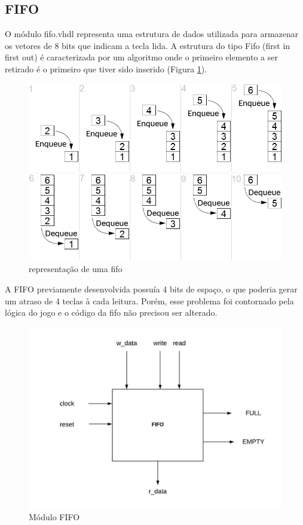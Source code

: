 \documentclass[a4paper,12pt,twoside]{article}
\begin{document}
\subsection{FIFO}
O módulo fifo.vhdl representa uma estrutura de dados utilizada para armazenar os vetores de 8 bits que indicam a tecla lida. A estrutura do tipo Fifo (first in first out) é caracterizada por um algoritmo onde o primeiro elemento a ser retirado é o primeiro que tiver sido inserido (Figura \ref{fig:fifo}). 

\begin{figure}[H]
\centering
\includegraphics[scale=0.7]{Fifo_queue.png}
\caption{representação de uma fifo}
\label{fig:fifo}
\end{figure}

A FIFO previamente desenvolvida possuía 4 bits de espaço, o que poderia gerar um atraso de 4 teclas à cada leitura. Porém, esse problema foi contornado pela lógica do jogo e o código da fifo não precisou ser alterado.

\begin{figure}[H]
\centering
\includegraphics[scale=0.7]{fifo.jpeg}
\caption{Módulo FIFO}
\label{fig:modulofifo}
\end{figure}
\end{document}
